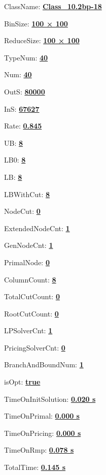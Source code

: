 \documentclass[11pt]{article}
\begin{document}
\pagestyle{empty}


ClassName: \underline{\textbf{Class_10.2bp-18}}
\par
BinSize: \underline{\textbf{100 × 100}}
\par
ReduceSize: \underline{\textbf{100 × 100}}
\par
TypeNum: \underline{\textbf{40}}
\par
Num: \underline{\textbf{40}}
\par
OutS: \underline{\textbf{80000}}
\par
InS: \underline{\textbf{67627}}
\par
Rate: \underline{\textbf{0.845}}
\par
UB: \underline{\textbf{8}}
\par
LB0: \underline{\textbf{8}}
\par
LB: \underline{\textbf{8}}
\par
LBWithCut: \underline{\textbf{8}}
\par
NodeCut: \underline{\textbf{0}}
\par
ExtendedNodeCnt: \underline{\textbf{1}}
\par
GenNodeCnt: \underline{\textbf{1}}
\par
PrimalNode: \underline{\textbf{0}}
\par
ColumnCount: \underline{\textbf{8}}
\par
TotalCutCount: \underline{\textbf{0}}
\par
RootCutCount: \underline{\textbf{0}}
\par
LPSolverCnt: \underline{\textbf{1}}
\par
PricingSolverCnt: \underline{\textbf{0}}
\par
BranchAndBoundNum: \underline{\textbf{1}}
\par
isOpt: \underline{\textbf{true}}
\par
TimeOnInitSolution: \underline{\textbf{0.020 s}}
\par
TimeOnPrimal: \underline{\textbf{0.000 s}}
\par
TimeOnPricing: \underline{\textbf{0.000 s}}
\par
TimeOnRmp: \underline{\textbf{0.078 s}}
\par
TotalTime: \underline{\textbf{0.145 s}}
\par
\newpage


\end{document}
